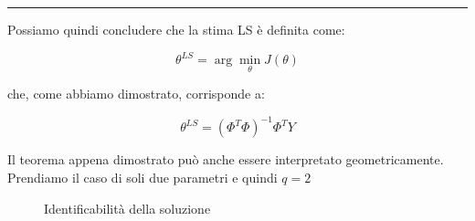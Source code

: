 \begin{center} \rule{300pt}{1pt} \end{center}
Possiamo quindi concludere che la stima LS è definita come:

  \[ \theta^{LS}=\arg \min_{\theta} J(\theta) \]
  
che, come abbiamo dimostrato, corrisponde a:

  \[ \theta^{LS}=(\Phi^T\Phi)^{-1}\Phi^TY \]

Il teorema appena dimostrato può anche essere interpretato geometricamente. Prendiamo il caso di soli due parametri e quindi $q=2$

\begin{figure}[htbp]
  \centering
  \caption{Identificabilità della soluzione\label{fig:identificabilitasoluzione}}
\end{figure}


